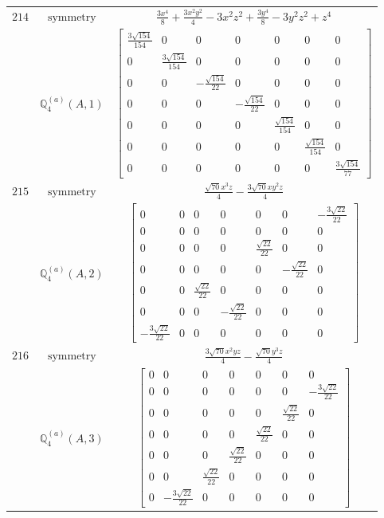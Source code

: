 \documentclass[fleqn,8pt,landscape]{jsarticle}
\begin{document}
\begin{longtable}{ccc}
$ 214 $ & $ \text{symmetry} $ & $ \frac{3 x^{4}}{8} + \frac{3 x^{2} y^{2}}{4} - 3 x^{2} z^{2} + \frac{3 y^{4}}{8} - 3 y^{2} z^{2} + z^{4} $ \\
$  $ & $ \mathbb{Q}_{4}^{(a)}(A,1) $ & $ \begin{bmatrix} \frac{3 \sqrt{154}}{154} & 0 & 0 & 0 & 0 & 0 & 0 \\ 0 & \frac{3 \sqrt{154}}{154} & 0 & 0 & 0 & 0 & 0 \\ 0 & 0 & - \frac{\sqrt{154}}{22} & 0 & 0 & 0 & 0 \\ 0 & 0 & 0 & - \frac{\sqrt{154}}{22} & 0 & 0 & 0 \\ 0 & 0 & 0 & 0 & \frac{\sqrt{154}}{154} & 0 & 0 \\ 0 & 0 & 0 & 0 & 0 & \frac{\sqrt{154}}{154} & 0 \\ 0 & 0 & 0 & 0 & 0 & 0 & \frac{3 \sqrt{154}}{77} \end{bmatrix} $ \\ \hline
$ 215 $ & $ \text{symmetry} $ & $ \frac{\sqrt{70} x^{3} z}{4} - \frac{3 \sqrt{70} x y^{2} z}{4} $ \\
$  $ & $ \mathbb{Q}_{4}^{(a)}(A,2) $ & $ \begin{bmatrix} 0 & 0 & 0 & 0 & 0 & 0 & - \frac{3 \sqrt{22}}{22} \\ 0 & 0 & 0 & 0 & 0 & 0 & 0 \\ 0 & 0 & 0 & 0 & \frac{\sqrt{22}}{22} & 0 & 0 \\ 0 & 0 & 0 & 0 & 0 & - \frac{\sqrt{22}}{22} & 0 \\ 0 & 0 & \frac{\sqrt{22}}{22} & 0 & 0 & 0 & 0 \\ 0 & 0 & 0 & - \frac{\sqrt{22}}{22} & 0 & 0 & 0 \\ - \frac{3 \sqrt{22}}{22} & 0 & 0 & 0 & 0 & 0 & 0 \end{bmatrix} $ \\ \hline
$ 216 $ & $ \text{symmetry} $ & $ \frac{3 \sqrt{70} x^{2} y z}{4} - \frac{\sqrt{70} y^{3} z}{4} $ \\
$  $ & $ \mathbb{Q}_{4}^{(a)}(A,3) $ & $ \begin{bmatrix} 0 & 0 & 0 & 0 & 0 & 0 & 0 \\ 0 & 0 & 0 & 0 & 0 & 0 & - \frac{3 \sqrt{22}}{22} \\ 0 & 0 & 0 & 0 & 0 & \frac{\sqrt{22}}{22} & 0 \\ 0 & 0 & 0 & 0 & \frac{\sqrt{22}}{22} & 0 & 0 \\ 0 & 0 & 0 & \frac{\sqrt{22}}{22} & 0 & 0 & 0 \\ 0 & 0 & \frac{\sqrt{22}}{22} & 0 & 0 & 0 & 0 \\ 0 & - \frac{3 \sqrt{22}}{22} & 0 & 0 & 0 & 0 & 0 \end{bmatrix} $ \\ \hline

\end{longtable}
\end{document}

